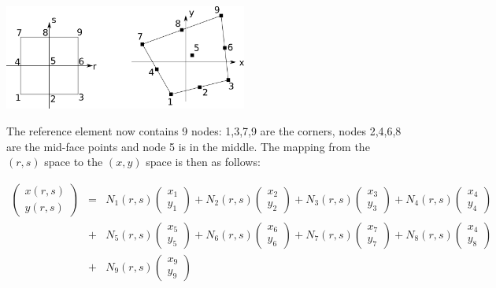 \begin{center}
\includegraphics[width=8cm]{images/mappings/biquadratic/mapping1}
\end{center}

The reference element now contains 9 nodes: 1,3,7,9 are the corners, nodes
2,4,6,8 are the mid-face points and node 5 is in the middle.
The mapping from the $(r,s)$ space to the $(x,y)$ space is then as follows:

\begin{eqnarray}
\left(
\begin{array}{c}
x(r,s) \\ y(r,s)
\end{array}
\right)
&=&
N_1(r,s)
\left(
\begin{array}{c}
x_1 \\ y_1
\end{array}
\right)
+
N_2(r,s)
\left(
\begin{array}{c}
x_2 \\ y_2
\end{array}
\right)
+
N_3(r,s)
\left(
\begin{array}{c}
x_3 \\ y_3
\end{array}
\right)
+
N_4(r,s)
\left(
\begin{array}{c}
x_4 \\ y_4
\end{array}
\right) \nonumber\\
&+&
N_5(r,s)
\left(
\begin{array}{c}
x_5 \\ y_5
\end{array}
\right)
+
N_6(r,s)
\left(
\begin{array}{c}
x_6 \\ y_6
\end{array}
\right)
+
N_7(r,s)
\left(
\begin{array}{c}
x_7 \\ y_7
\end{array}
\right)
+
N_8(r,s)
\left(
\begin{array}{c}
x_4 \\ y_8
\end{array}
\right) \nonumber\\
&+&
N_9(r,s)
\left(
\begin{array}{c}
x_9 \\ y_9
\end{array}
\right) 
\nonumber
\end{eqnarray}
